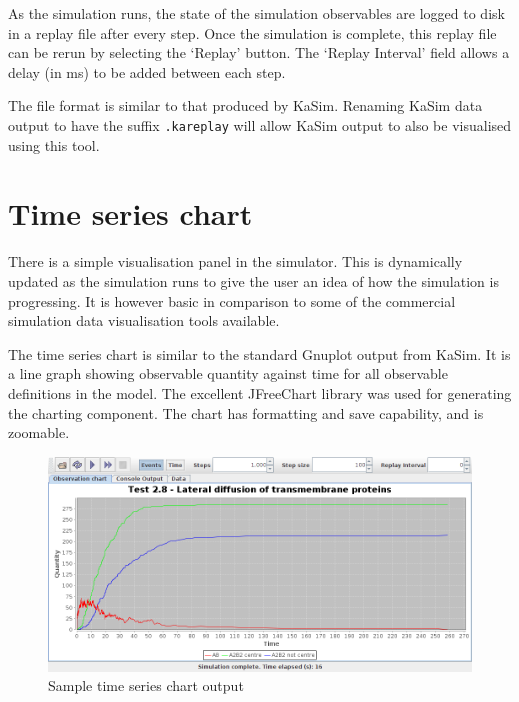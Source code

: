\documentclass[english]{report}
\begin{document}
As the simulation runs, the state of the simulation observables are logged to disk in a replay file after every step. Once the simulation is complete, this replay file can be rerun by selecting the `Replay' button. The `Replay Interval' field allows a delay (in ms) to be added between each step.

The file format is similar to that produced by KaSim. Renaming KaSim data output to have the suffix \verb|.kareplay| will allow KaSim output to also be visualised using this tool.

\section{Time series chart}

There is a simple visualisation panel in the simulator. This is dynamically updated as the simulation runs to give the user an idea of how the simulation is progressing. It is however basic in comparison to some of the commercial simulation data visualisation tools available.

The time series chart is similar to the standard Gnuplot output from KaSim. It is a line graph showing observable quantity against time for all observable definitions in the model. The excellent JFreeChart \citep{JFreeChartwebsite} library was used for generating the charting component. The chart has formatting and save capability, and is zoomable.

\begin{figure}[h!]
 \centering
 \includegraphics[scale=0.4]{./images/ChartPane.png}
 \caption{Sample time series chart output}
 \label{fig:chartPane}
\end{figure}
\end{document}
